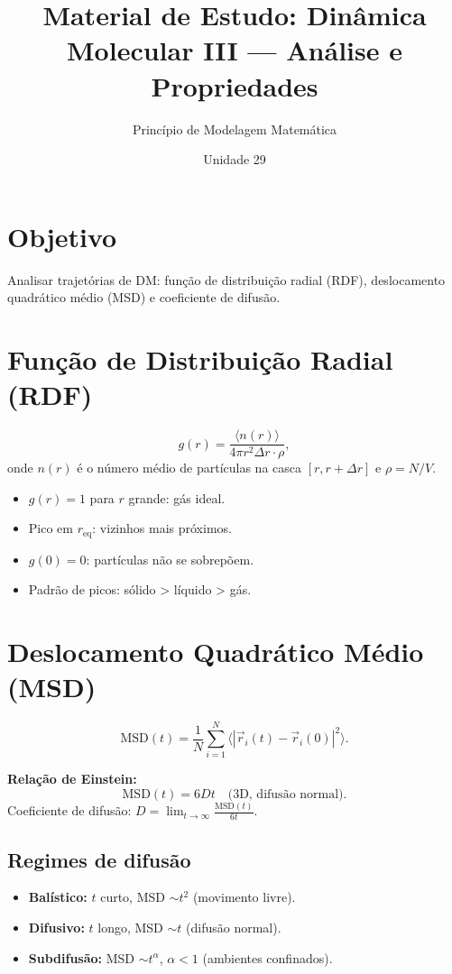 \documentclass[12pt,a4paper]{article}
\title{Material de Estudo: Din\^amica Molecular III --- An\'alise e Propriedades}
\author{Princ\'ipio de Modelagem Matem\'atica}
\date{Unidade 29}
\begin{document}
\maketitle

\section*{Objetivo}
Analisar trajet\'orias de DM: fun\c{c}\~ao de distribui\c{c}\~ao radial (RDF), deslocamento quadr\'atico m\'edio (MSD) e coeficiente de difus\~ao.

\section*{Fun\c{c}\~ao de Distribui\c{c}\~ao Radial (RDF)}

\[
g(r) = \frac{\langle n(r) \rangle}{4\pi r^2 \Delta r \cdot \rho},
\]
onde $n(r)$ \'e o n\'umero m\'edio de part\'iculas na casca $[r, r+\Delta r]$ e $\rho = N/V$.
\begin{itemize}
  \item $g(r)=1$ para $r$ grande: gás ideal.
  \item Pico em $r_\text{eq}$: vizinhos mais pr\'oximos.
  \item $g(0) = 0$: part\'iculas n\~ao se sobrep\~oem.
  \item Padr\~ao de picos: s\'olido > l\'iquido > g\'as.
\end{itemize}

\section*{Deslocamento Quadr\'atico M\'edio (MSD)}

\[
\text{MSD}(t) = \frac{1}{N}\sum_{i=1}^N \langle|\vec{r}_i(t) - \vec{r}_i(0)|^2\rangle.
\]

\textbf{Rela\c{c}\~ao de Einstein:}
\[
\text{MSD}(t) = 6Dt \quad \text{(3D, difus\~ao normal)}.
\]
Coeficiente de difus\~ao: $D = \lim_{t\to\infty} \frac{\text{MSD}(t)}{6t}$.

\subsection*{Regimes de difus\~ao}
\begin{itemize}
  \item \textbf{Bal\'istico:} $t$ curto, MSD $\sim t^2$ (movimento livre).
  \item \textbf{Difusivo:} $t$ longo, MSD $\sim t$ (difus\~ao normal).
  \item \textbf{Subdifus\~ao:} MSD $\sim t^\alpha$, $\alpha < 1$ (ambientes confinados).
\end{itemize}
\end{document}
